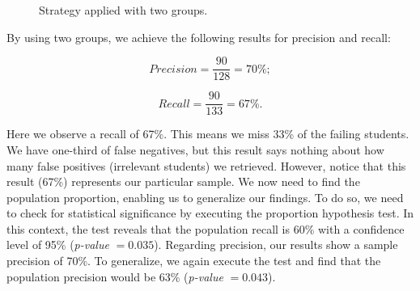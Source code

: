 \begin{figure}[!ht]
\begin{center}
{             \label{fig:2-2013-01}
         }
     \end{center}
     \caption{Strategy applied with two groups.}
	 \label{fig:2-groups}
\end{figure}

By using two groups, we achieve the following results for precision and recall:

\vspace{0.2cm}
\noindent
\begin{minipage}{.5\linewidth}
\centering
$$
Precision = \frac{90}{128} = 70\%;
$$
\end{minipage}
\begin{minipage}{.5\linewidth}
$$
Recall = \frac{90}{133} = 67\%.
$$
\end{minipage}
\vspace{0.2cm}

Here we observe a recall of 67\%. This means we miss 33\% of the failing students. We have one-third of false negatives, but this result says nothing about how many false positives (irrelevant students) we retrieved. However, notice that this result (67\%) represents our particular sample. We now need to find the population proportion, enabling us to generalize our findings. To do so, we need to check for statistical significance by executing the proportion hypothesis test. In this context, the test reveals that the population recall is 60\% with a confidence level of 95\% (\textit{p-value} $= 0.035$). Regarding precision, our results show a sample precision of 70\%. To generalize, we again execute the test and find that the population precision would be 63\% (\textit{p-value} $= 0.043$).

